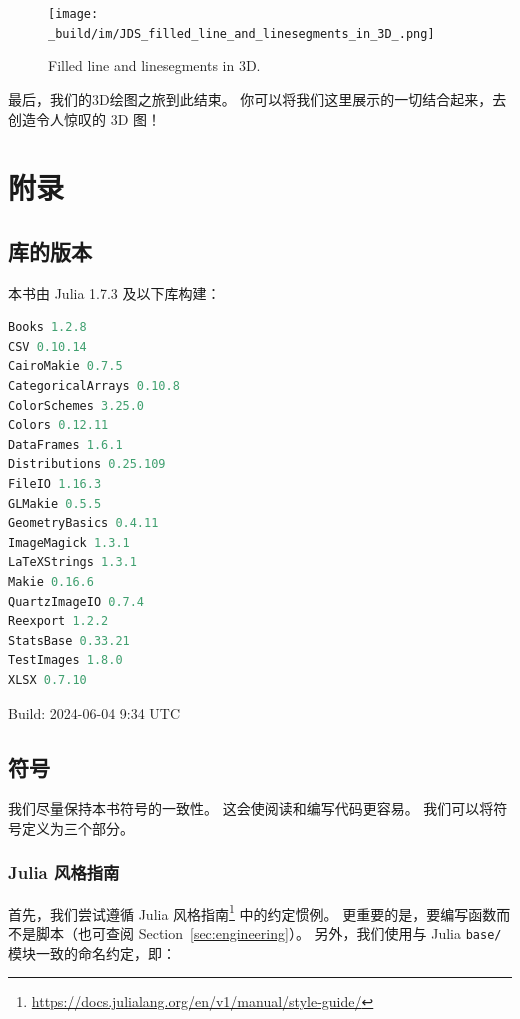 \documentclass[
  notoc %
]{tufte-book}
\DeclareRobustCommand{\href}[2]{#2\footnote{\url{#1}}}
\newcommand{\passthrough}[1]{#1}
\begin{document}
\begin{figure}
\hypertarget{fig:filled_line_and_linesegments_in_3D}{%
\centering
\texttt{[image: \_build/im/JDS\_filled\_line\_and\_linesegments\_in\_3D\_.png]}
\caption{Filled line and linesegments in
3D.}\label{fig:filled_line_and_linesegments_in_3D}
}
\end{figure}

最后，我们的3D绘图之旅到此结束。
你可以将我们这里展示的一切结合起来，去创造令人惊叹的 3D 图！

\hypertarget{sec:appendix}{%
\chapter{附录}\label{sec:appendix}}

\hypertarget{sec:appendix_pkg}{%
\section{库的版本}\label{sec:appendix_pkg}}

本书由 Julia 1.7.3 及以下库构建：

\begin{lstlisting}[language=Julia]
Books 1.2.8
CSV 0.10.14
CairoMakie 0.7.5
CategoricalArrays 0.10.8
ColorSchemes 3.25.0
Colors 0.12.11
DataFrames 1.6.1
Distributions 0.25.109
FileIO 1.16.3
GLMakie 0.5.5
GeometryBasics 0.4.11
ImageMagick 1.3.1
LaTeXStrings 1.3.1
Makie 0.16.6
QuartzImageIO 0.7.4
Reexport 1.2.2
StatsBase 0.33.21
TestImages 1.8.0
XLSX 0.7.10
\end{lstlisting}

Build: 2024-06-04 9:34 UTC

\hypertarget{sec:notation}{%
\section{符号}\label{sec:notation}}

我们尽量保持本书符号的一致性。 这会使阅读和编写代码更容易。
我们可以将符号定义为三个部分。

\hypertarget{sec:julia_style_guide}{%
\subsection{Julia 风格指南}\label{sec:julia_style_guide}}

首先，我们尝试遵循
\href{https://docs.julialang.org/en/v1/manual/style-guide/}{Julia
风格指南} 中的约定惯例。 更重要的是，要编写函数而不是脚本（也可查阅
Section~\ref{sec:engineering}）。 另外，我们使用与 Julia
\passthrough{\lstinline!base/!} 模块一致的命名约定，即：
\end{document}
